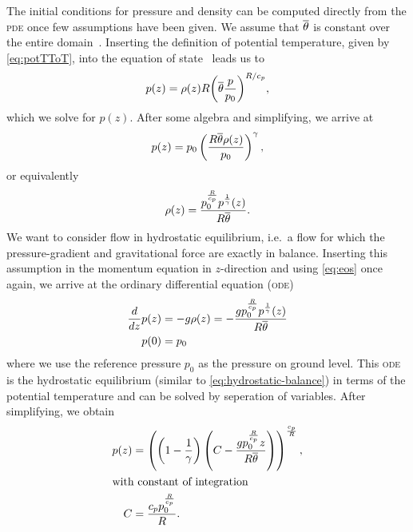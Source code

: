 The initial conditions for pressure and density can be computed directly from the \textsc{pde} once few assumptions have been given.
We assume that $\overline{\theta}$ is constant over the entire domain~\cite{giraldo2008study}.
Inserting the definition of potential temperature, given by \cref{eq:potTToT}, into the equation of state~ leads us to
\begin{equation}
  p(z) = \rho(z) R {\left( \overline{\theta} \frac{p}{p_0}\right)}^{R/c_p},
\end{equation}
which we solve for $p(z)$.
After some algebra and simplifying, we arrive at
\begin{equation}
 p(z) = p_0 \left( \frac{R \overline{\theta} \rho(z)}{p_0} \right)^{\gamma},
\end{equation}
or equivalently
\begin{equation}
  \label{eq:eos-potT}
\rho(z) = \frac{p_{0}^{\frac{R}{c_{p}}} p^{\frac{1}{\gamma}}{\left (z \right )}}{R \overline{\theta}}.
\end{equation}
We want to consider flow in hydrostatic equilibrium, i.e.\ a flow for which the pressure-gradient and gravitational force are exactly in balance.
Inserting this assumption in the momentum equation in $z$-direction and using \cref{eq:eos} once again, we arrive at the ordinary differential equation (\textsc{ode})
\begin{align}
  \label{eq:hydrostatic-balance-potT}
  \begin{split}
  \frac{d}{d z} p{\left (z \right )} &= -g \rho(z)
                                     = 
        - \frac{g p_{0}^{\frac{R}{c_{p}}} p^{\frac{1}{\gamma}}{\left (z \right )}}{R \overline{\theta}}\\
  p{\left (0 \right )} &= p_0
  \end{split}
\end{align}
where we use the reference pressure $p_0$ as the pressure on ground level.
This \textsc{ode} is the hydrostatic equilibrium (similar to \cref{eq:hydrostatic-balance}) in terms of the potential temperature and can be solved by seperation of variables.
After simplifying, we obtain
\begin{align}
  \label{eq:hydrostatic-background-pressure}
p(z) &= \left(\left(1 - \frac{1}{\gamma}\right) \left(C - \frac{g p_{0}^{\frac{R}{c_{p}}} z}{R \overline{\theta}}\right)\right)^{\frac{c_{p}}{R}},\\
\shortintertext{with constant of integration}
 C &= \frac{c_{p} p_{0}^{\frac{R}{c_{p}}}}{R}.
\end{align}


